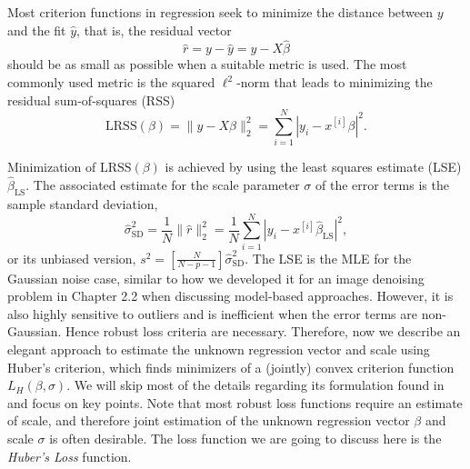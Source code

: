 Most criterion functions in regression seek to minimize the distance between $y$ and the fit $\hat{y}$, that is, the residual vector
\[
\hat{r} = y - \hat{y} = y - X\hat{\beta}
\]
should be as small as possible when a suitable metric is used. The most commonly used metric is the squared $\ell^2$-norm that leads to minimizing the residual sum-of-squares (RSS)
\[
\text{LRSS}(\beta) = \|y - X\beta\|_2^2 = \sum_{i=1}^N \left| y_i - x^{[i]}\beta \right|^2. \label{eq:rss}
\]

Minimization of $\text{LRSS}(\beta)$ is achieved by using the least squares estimate (LSE) $\hat{\beta}_{\text{LS}}$. The associated estimate for the scale parameter $\sigma$ of the error terms is the sample standard deviation,
\[
\hat{\sigma}_{\text{SD}}^2 = \frac{1}{N} \|\hat{r}\|_2^2 = \frac{1}{N} \sum_{i=1}^N \left| y_i - x^{[i]}\hat{\beta}_{\text{LS}} \right|^2, \label{eq:sd}
\]
or its unbiased version, $s^2 = \left[ \frac{N}{N - p - 1} \right] \hat{\sigma}_{\text{SD}}^2$. The LSE is the MLE for the Gaussian noise case, similar to how we developed it for an image denoising problem in Chapter 2.2 when discussing model-based approaches. However, it is also highly sensitive to outliers and is inefficient when the error terms are non-Gaussian. Hence robust loss criteria are necessary. Therefore, now we describe an elegant approach to estimate the unknown regression vector and scale using Huber’s criterion, which finds minimizers of a (jointly) convex criterion function $L_H(\beta, \sigma)$. We will skip most of the details regarding its formulation found in \cite {stat_book} and focus on key points. Note that most robust loss functions require an estimate of scale, and therefore joint estimation of the unknown regression vector $\beta$ and scale $\sigma$ is often desirable. The loss function we are going to discuss here is the \textit{Huber's Loss} function. 

